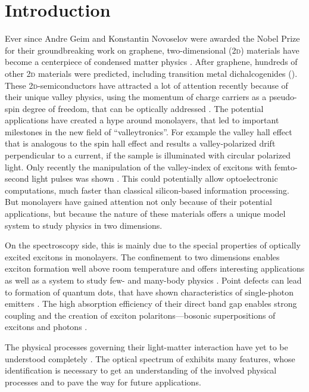 \chapter{Introduction}
Ever since Andre Geim and Konstantin Novoselov were awarded the Nobel Prize for their groundbreaking work on graphene, two-dimensional (2\textsc{d}) materials have become a centerpiece of condensed matter physics \cite{novoselov_electric_2004}. After graphene, hundreds of other 2\textsc{d} materials were predicted, including transition metal dichalcogenides (\tmds\!). These 2\textsc{d}-semiconductors have attracted a lot of attention recently because of their unique valley physics, using the momentum of charge carriers as a pseudo-spin degree of freedom, that can be optically addressed \cite{wang_electronics_2012}. The potential applications have created a hype around \tmdg monolayers, that led to important milestones in the new field of ``valleytronics''. For example the valley hall effect \cite{mak_valley_2014} that is analogous to the spin hall effect and results a valley-polarized drift perpendicular to a current, if the sample is illuminated with circular polarized light. Only recently the manipulation of the valley-index of excitons with femto-second light pulses was shown \cite{langer_lightwave_2018}. This could potentially allow optoelectronic computations, much faster than classical silicon-based information processing. But \tmdg monolayers have gained attention not only because of their potential applications, but because the nature of these materials offers a unique model system to study physics in two dimensions. 

On the spectroscopy side, this is mainly due to the special properties of optically excited excitons in \tmdg monolayers. The confinement to two dimensions enables exciton formation well above room temperature and offers interesting applications as well as a system to study few- and many-body physics \cite{chernikov_exciton_2014}. Point defects can lead to formation of quantum dots, that have shown characteristics of single-photon emitters \cite{srivastava_optically_2015}. The high absorption efficiency of their direct band gap enables strong coupling and the creation of exciton polaritons---bosonic superpositions of excitons and photons \cite{liu_control_2017,zhang_photonic-crystal_2018}.

The physical processes governing their light-matter interaction have yet to be understood completely \cite{koperski_optical_2017}. The optical spectrum of \tmds exhibits many features, whose identification is necessary to get an understanding of the involved physical processes and to pave the way for future applications. 

